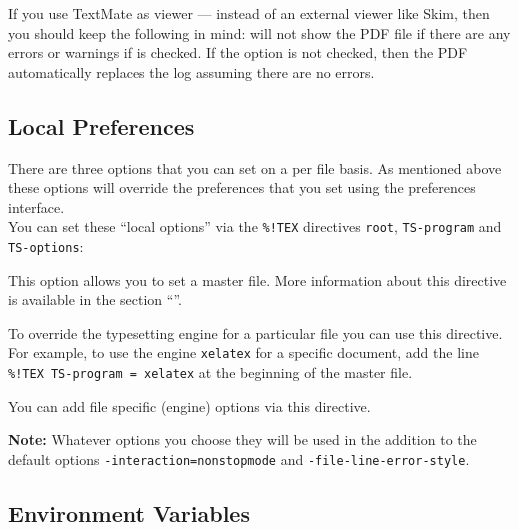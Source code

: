 \documentclass[11pt, x11names]{article}
\begin{document}
If you use TextMate as viewer — instead of an external viewer like Skim, then you should keep the following in mind:  will not show the PDF file if there are any errors or warnings if  is checked. If the option is not checked, then the PDF automatically replaces the log assuming there are no errors.

\subsection{Local Preferences}
\label{sec:Local_Preferences}

There are three options that you can set on a per file basis. As mentioned above these options will override the preferences that you set using the preferences interface.\\[0.2cm]

You can set these “local options” via the \texttt{\%!TEX} directives \texttt{root}, \texttt{TS-program} and \texttt{TS-options}:

\begin{description}[style=multiline, leftmargin=2.4cm]

  \item[\texttt{root}] This option allows you to set a master file. More information about this directive is available in the section “”.

  \item[\texttt{TS-program}] To override the typesetting engine for a particular file you can use this directive. For example, to use the engine \texttt{xelatex} for a specific document, add the line \texttt{\%!TEX\ TS-program\ =\ xelatex} at the beginning of the master file.
  \emph\emph{{}}
  \item[\texttt{TS-options}] You can add file specific (engine) options via this directive.

  \begin{sloppypar}
    \textbf{Note:} Whatever options you choose they will be used in the addition to the default options \texttt{-interaction=nonstopmode} and \texttt{-file-line-error-style}.
  \end{sloppypar}

\end{description}

\subsection{Environment Variables}
\end{document}
